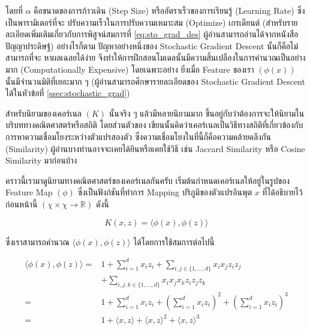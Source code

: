 \noindent โดยที่ $\alpha$ คือขนาดของการก้าวเดิน (Step Size) หรืออัตราเร็วของการเรียนรู้ (Learning Rate) ซึ่งเป็นพารามิเตอร์ที่จะ%
ปรับความเร็วในการปรับความเหมาะสม (Optimize) เกรเดียนต์ (สำหรับรายละเอียดเพิ่มเติมเกี่ยวกับการพิสูจน์สมการที่ \eqref{eq:sto_grad_des}
ผู้อ่านสามารถอ่านได้จากหนังสือปัญญาประดิษฐ์) อย่างไรก็ตาม ปัญหาอย่างหนึ่งของ Stochastic Gradient Descent นั้นก็คือไม่สามารถที่จะ%
หาผลเฉลยได้ง่าย จึงทำให้การฝึกสอนโมเดลนั้นมีความสิ้นเปลืองในการคำนวณเป็นอย่างมาก (Computationally Expensive) โดยเฉพาะอย่าง%
ยิ่งเมื่อ Feature ของเรา $(\phi(x))$ นั้นมีจำนวนมิติที่เยอะมาก ๆ (ผู้อ่านสามารถศึกษารายละเอียดของ Stochastic Gradient Descent
ได้ในหัวข้อที่ \ref{ssec:stochastic_grad})

สำหรับนิยามของเคอร์เนล $(K)$ นั้นจริง ๆ แล้วมีหลายนิยามมาก ขึ้นอยู่กับว่าต้องการจะให้นิยามในบริบททางคณิตศาสตร์หรือสถิติ โดยส่วนตัวของ%
เขียนนั้นคิดว่าเคอร์เนลเป็นวิธีทางสถิติที่เกี่ยวข้องกับการหาความเชื่อมโยงระหว่างตัวแปรสองตัว ซึ่งความเชื่อมโยงในที่นี้ก็คือความคล้ายคลึงกัน
(Similarity) ผู้อ่านบางท่านอาจจะเคยได้ยินหรือเคยใช้วิธี เช่น Jaccard Similarity หรือ Cosine Similarity มาก่อนบ้าง

คราวนี้เรามาดูนิยามทางคณิตศาสตร์ของเคอร์เนลกันครับ เริ่มต้นกำหนดเคอร์เนลให้อยู่ในรูปของ Feature Map $(\phi)$ ซึ่งเป็นฟังก์ชันที่ทำการ
Mapping ปริภูมิของตัวแปรอินพุต $x$ ที่ได้อธิบายไว้ก่อนหน้านี้ $(\chi \times \chi \rightarrow \mathbb{R})$ ดังนี้

\begin{equation}\label{eq:kernel}
    K(x,z) = \langle\phi(x),\phi(z)\rangle
\end{equation}

\noindent ซึ่งเราสามารถคำนวณ $\langle\phi(x),\phi(z)\rangle$ ได้โดยการใช้สมการต่อไปนี้

\begin{align}
    \langle\phi(x),\phi(z)\rangle = & 1 + \sum_{i=1}^d x_i z_i +
    \sum_{i,j\in\{1,\ldots,d\}} x_i x_j z_i z_j \nonumber                                                                                      \\
                                    & + \sum_{i,j,k \in \{1,\ldots,d\}} x_i x_j x_k z_i z_j z_k                                                \\
    =                               & 1 + \sum_{i=1}^d x_i z_i + \left(\sum_{i=1}^d x_i z_i \right)^2 + \left( \sum_{i=1}^d x_i z_i \right)^3  \\
    =                               & 1 + \langle x,z \rangle + \langle x,z \rangle^2 + \langle x,z \rangle^3\label{eq:feat_map_inner_product}
\end{align}

